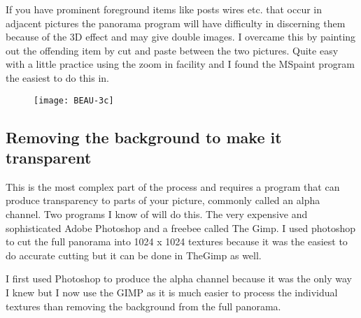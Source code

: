 If you have prominent foreground items like posts wires etc. that occur
in adjacent pictures the panorama program will have difficulty in
discerning them because of the 3D effect and may give double images. I
overcame this by painting out the offending item by cut and paste
between the two pictures. Quite easy with a little practice using the
zoom in facility and I found the MSpaint program the easiest to do this
in.

\begin{figure}[h]
\centering\texttt{[image: BEAU-3c]}
\end{figure}

\subsection{Removing the background to make it
transparent}\label{removing-the-background-to-make-it-transparent}

This is the most complex part of the process and requires a program that
can produce transparency to parts of your picture, commonly called an
alpha channel. Two programs I know of will do this. The very expensive
and sophisticated Adobe Photoshop and a freebee called The Gimp. I used
photoshop to cut the full panorama into 1024 x 1024 textures because it
was the easiest to do accurate cutting but it can be done in TheGimp as
well.

I first used Photoshop to produce the alpha channel because it was the
only way I knew but I now use the GIMP as it is much easier to process
the individual textures than removing the background from the full
panorama.

